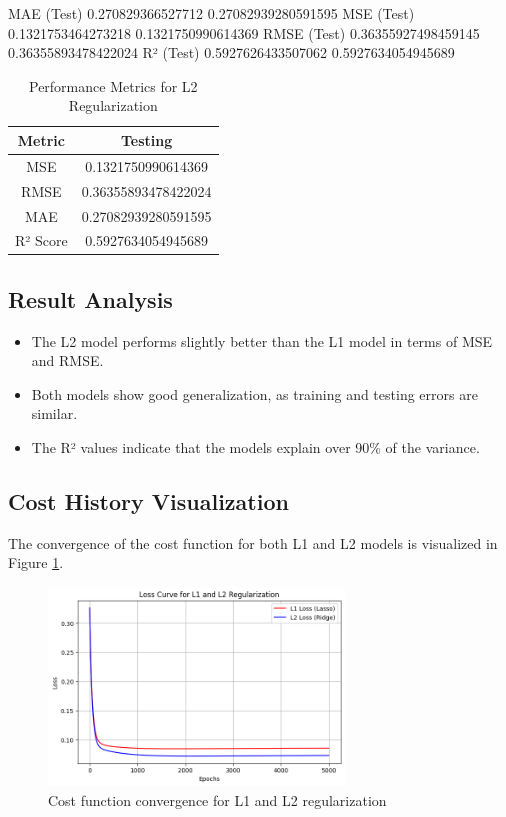 \documentclass{article}
\begin{document}
MAE (Test)           0.270829366527712    0.27082939280591595 
MSE (Test)           0.1321753464273218   0.1321750990614369  
RMSE (Test)          0.36355927498459145  0.36355893478422024 
R² (Test)            0.5927626433507062   0.5927634054945689  
\begin{table}[h]
    \centering
    \caption{Performance Metrics for L2 Regularization}
    \label{tab:l2_performance}
    \begin{tabular}{|c|c|}
        \hline
        \textbf{Metric} & \textbf{Testing} \\
        \hline
        MSE &  0.1321750990614369 \\
        \hline
        RMSE &   0.36355893478422024  \\
        \hline
        MAE &   0.27082939280591595  \\
        \hline
        R² Score & 0.5927634054945689   \\
        \hline
    \end{tabular}
\end{table}


\subsection{Result Analysis}
\begin{itemize}
    \item The L2 model performs slightly better than the L1 model in terms of MSE and RMSE.
    \item Both models show good generalization, as training and testing errors are similar.
    \item The R² values indicate that the models explain over 90\% of the variance.
\end{itemize}

\subsection{Cost History Visualization}
The convergence of the cost function for both L1 and L2 models is visualized in Figure \ref{fig:cost_history}.
\begin{figure}[h]
    \centering
    \includegraphics[width=0.7\textwidth]{cost_history.png}
    \caption{Cost function convergence for L1 and L2 regularization}
    \label{fig:cost_history}
\end{figure}
\end{document}
